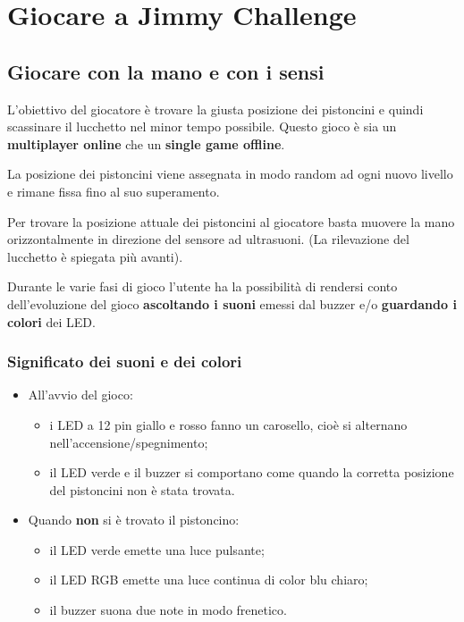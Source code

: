 \chapter{Giocare a Jimmy Challenge}
\section{Giocare con la mano e con i sensi}
L'obiettivo del giocatore è trovare la giusta posizione dei pistoncini e quindi scassinare il lucchetto nel minor tempo possibile. Questo gioco è sia un \textbf{multiplayer online} che un \textbf{single game offline}.

La posizione dei pistoncini viene assegnata in modo random ad ogni nuovo livello e rimane fissa fino al suo superamento.

Per trovare la posizione attuale dei pistoncini al giocatore basta muovere la mano orizzontalmente in direzione del sensore ad ultrasuoni. (La rilevazione del lucchetto è spiegata più avanti).

Durante le varie fasi di gioco l'utente ha la possibilità di rendersi conto dell'evoluzione del gioco \textbf{ascoltando i suoni} emessi dal buzzer e/o \textbf{guardando i colori} dei LED.

\subsection{Significato dei suoni e dei colori}
\begin{itemize}
	\item All'avvio del gioco:
	\begin{itemize}
		\item i LED a 12 pin giallo e rosso fanno un carosello, cioè si alternano nell'accensione/spegnimento;
		\item il LED verde e il buzzer si comportano come quando la corretta posizione del pistoncini non è stata trovata.
	\end{itemize}
\end{itemize}

\begin{itemize}
	\item Quando \textbf{non} si è trovato il pistoncino:
	\begin{itemize}
		\item il LED verde emette una luce pulsante;
		\item il LED RGB emette una luce continua di color blu chiaro;
		\item il buzzer suona due note in modo frenetico.
	\end{itemize}
\end{itemize}

